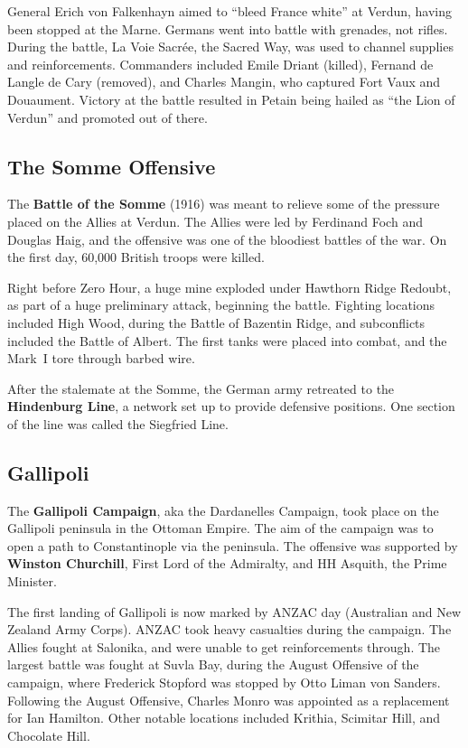 General Erich von Falkenhayn aimed to ``bleed France white'' at Verdun,
having been stopped at the Marne.
Germans went into battle with grenades, not rifles.
During the battle, La Voie Sacr\'ee, the Sacred Way, was used to channel supplies and reinforcements.
Commanders included Emile Driant (killed), Fernand de Langle de Cary (removed),
and Charles Mangin, who captured Fort Vaux and Douaument.
Victory at the battle resulted in Petain being hailed as ``the Lion of Verdun'' and promoted out of there.

\subsection*{The Somme Offensive}

The \textbf{Battle of the Somme} (1916) was meant to relieve some of the pressure placed on the Allies at Verdun.
The Allies were led by Ferdinand Foch and Douglas Haig,
and the offensive was one of the bloodiest battles of the war.
On the first day, 60,000 British troops were killed.

Right before Zero Hour, a huge mine exploded under Hawthorn Ridge Redoubt,
as part of a huge preliminary attack, beginning the battle.
Fighting locations included High Wood, during the Battle of Bazentin Ridge,
and subconflicts included the Battle of Albert.
The first tanks were placed into combat, and the Mark~I tore through barbed wire.

After the stalemate at the Somme, the German army retreated to the \textbf{Hindenburg Line},
a network set up to provide defensive positions.
One section of the line was called the Siegfried Line.

\subsection*{Gallipoli}

The \textbf{Gallipoli Campaign}, aka the Dardanelles Campaign,
took place on the Gallipoli peninsula in the Ottoman Empire.
The aim of the campaign was to open a path to Constantinople via the peninsula.
The offensive was supported by \textbf{Winston Churchill}, First Lord of the Admiralty,
and HH Asquith, the Prime Minister.

The first landing of Gallipoli is now marked by ANZAC day (Australian and New Zealand Army Corps).
ANZAC took heavy casualties during the campaign.
The Allies fought at Salonika, and were unable to get reinforcements through.
The largest battle was fought at Suvla Bay, during the August Offensive of the campaign,
where Frederick Stopford was stopped by Otto Liman von Sanders.
Following the August Offensive, Charles Monro was appointed as a replacement for Ian Hamilton.
Other notable locations included Krithia, Scimitar Hill, and Chocolate Hill.


